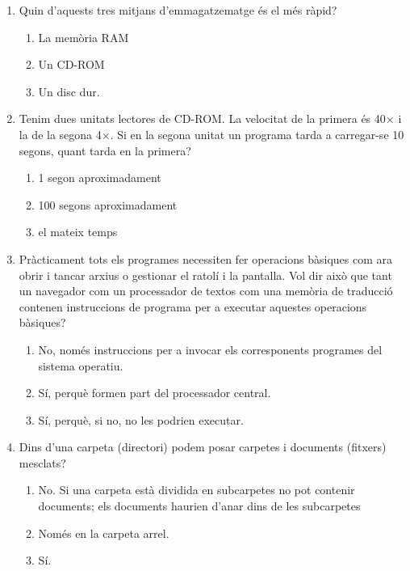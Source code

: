 \begin{enumerate}
\item Quin d'aquests tres mitjans d'emmagatzematge és el més ràpid?
   
\begin{enumerate}
\item La memòria RAM
\item Un CD-ROM
\item Un disc dur.
\end{enumerate}


\item Tenim dues unitats lectores de CD-ROM. La velocitat de la
   primera és 40\begin{math}\times\end{math} i la de la segona
   4\begin{math}\times\end{math}. Si en la segona unitat un programa tarda a
   carregar-se 10 segons, quant tarda en la primera?
   
\begin{enumerate}
\item 1 segon aproximadament
\item 100 segons aproximadament
\item el mateix temps
\end{enumerate}

\item Pràcticament tots els programes necessiten fer operacions
   bàsiques com ara obrir i tancar arxius o gestionar el ratolí i la
   pantalla. Vol dir això que tant un navegador com un processador de
   textos com una memòria de traducció contenen instruccions de
   programa per a executar aquestes operacions bàsiques?
   
\begin{enumerate}
\item No, només instruccions per a invocar els corresponents
      programes del sistema operatiu.
\item Sí, perquè formen part del processador central.
\item Sí, perquè, si no, no les podrien executar.
\end{enumerate}

\item Dins d'una carpeta (directori) podem posar carpetes i
   documents (fitxers)
   mesclats? 
   
\begin{enumerate}
\item No. Si una carpeta està dividida en subcarpetes no pot
      contenir documents; els documents haurien d'anar dins de les subcarpetes
\item Només en la carpeta arrel.
\item Sí. 
\end{enumerate}


\end{enumerate}
